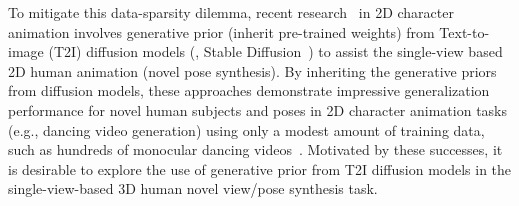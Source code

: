To mitigate this data-sparsity dilemma, recent research~\cite{bhunia2023person, karras2023dreampose,wang2023disco, chang2023magicpose, xu2024magicanimate,hu2024animate,zhu2024champ,zhang2024mimicmotion,kim2024tcan, liyuan2024cfsynthesis} in 2D character animation involves generative prior (inherit pre-trained weights) from Text-to-image (T2I) diffusion models (\eg, Stable Diffusion~\cite{rombach2021highresolution}) to assist the single-view based 2D human animation (novel pose synthesis).
By inheriting the generative priors from diffusion models, these approaches demonstrate impressive generalization performance for novel human subjects and poses in 2D character animation tasks (e.g., dancing video generation) using only a modest amount of training data, such as hundreds of monocular dancing videos~\cite{jafarian2021learning}.
Motivated by these successes, it is desirable to explore the use of generative prior from T2I diffusion models in the single-view-based 3D human novel view/pose synthesis task.


